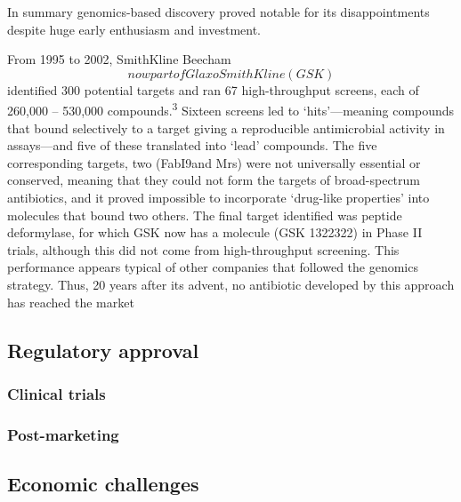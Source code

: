 \documentclass[
]{book}
\begin{document}
In summary genomics-based discovery proved notable for its disappointments despite huge early enthusiasm and investment.

From 1995 to 2002, SmithKline Beecham \[now part of GlaxoSmithKline (GSK)\] identified 300 potential targets and ran 67 high-throughput screens, each of 260,000 -- 530,000 compounds.\textsuperscript{3} Sixteen screens led to `hits'---meaning compounds that bound selectively to a target giving a reproducible antimicrobial activity in assays---and five of these translated into `lead' compounds. The five corresponding targets, two (FabI9and Mrs) were not universally essential or conserved, meaning that they could not form the targets of broad-spectrum antibiotics, and it proved impossible to incorporate `drug-like properties' into molecules that bound two others. The final target identified was peptide deformylase, for which GSK now has a molecule (GSK 1322322) in Phase II trials, although this did not come from high-throughput screening. This performance appears typical of other companies that followed the genomics strategy. Thus, 20 years after its advent, no antibiotic developed by this approach has reached the market

\hypertarget{regulatory-approval}{%
\subsection*{Regulatory approval}\label{regulatory-approval}}

\hypertarget{clinical-trials}{%
\subsubsection*{Clinical trials}\label{clinical-trials}}

\hypertarget{post-marketing}{%
\subsubsection*{Post-marketing}\label{post-marketing}}

\hypertarget{economic-challenges}{%
\subsection*{Economic challenges}\label{economic-challenges}}
\end{document}
